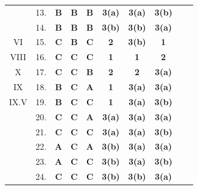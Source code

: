 \begin{table}[h!]
\begin{tabular}{c r c  c  c  c  c  c c c}
& 13. &  \textbf{B} & \textbf{B} & \textbf{B} & \textbf{3(a)} & \textbf{3(a)} & \textbf{3(b)}  \\ 
& 14. &  \textbf{B} & \textbf{B} & \textbf{B} & \textbf{3(b)} & \textbf{3(b)} & \textbf{3(a)}  \\ 
VI & 15. &  \textbf{C} & \textbf{B} & \textbf{C} & \textbf{2} & \textbf{3(b)} & \textbf{1}  \\ 
VIII & 16. &  \textbf{C} & \textbf{C} & \textbf{C} & \textbf{1} & \textbf{1} & \textbf{2}  \\ 
X & 17. &  \textbf{C} & \textbf{C} & \textbf{B} & \textbf{2} & \textbf{2} & \textbf{3(a)}  \\ 
IX & 18. &  \textbf{B} & \textbf{C} & \textbf{A} & \textbf{1} & \textbf{3(a)} & \textbf{3(a)}  \\ 
IX.V & 19. &  \textbf{B} & \textbf{C} & \textbf{C} & \textbf{1} & \textbf{3(a)} & \textbf{3(b)}  \\ 
& 20. &  \textbf{C} & \textbf{C} & \textbf{A} & \textbf{3(a)} & \textbf{3(a)} & \textbf{3(a)}  \\ 
& 21. &  \textbf{C} & \textbf{C} & \textbf{C} & \textbf{3(a)} & \textbf{3(a)} & \textbf{3(b)}  \\ 
& 22. &  \textbf{A} & \textbf{C} & \textbf{A} & \textbf{3(b)} & \textbf{3(a)} & \textbf{3(a)}  \\ 
& 23. &  \textbf{A} & \textbf{C} & \textbf{C} & \textbf{3(b)} & \textbf{3(a)} & \textbf{3(b)}  \\
& 24. &  \textbf{C} & \textbf{C} & \textbf{C} & \textbf{3(b)} & \textbf{3(b)} & \textbf{3(a)}  \\
\bottomrule
\end{tabular}
\egroup
\end{table}


